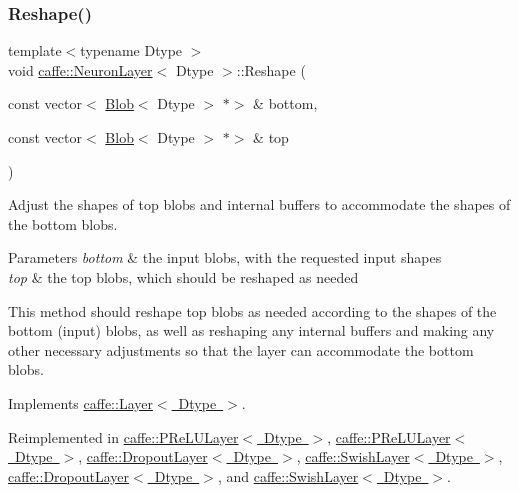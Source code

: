 \mbox{\label{classcaffe_1_1_neuron_layer_a6d0facf4a5e6f459cf1cb8b28d945790}} 
\subsubsection{\texorpdfstring{Reshape()}{Reshape()}\hspace{0.1cm}{\footnotesize\ttfamily [2/2]}}
{\footnotesize\ttfamily template$<$typename Dtype $>$ \\
void \mbox{\hyperlink{classcaffe_1_1_neuron_layer}{caffe\+::\+Neuron\+Layer}}$<$ Dtype $>$\+::Reshape (\begin{DoxyParamCaption}\item[{const vector$<$ \mbox{\hyperlink{classcaffe_1_1_blob}{Blob}}$<$ Dtype $>$ $\ast$$>$ \&}]{bottom,  }\item[{const vector$<$ \mbox{\hyperlink{classcaffe_1_1_blob}{Blob}}$<$ Dtype $>$ $\ast$$>$ \&}]{top }\end{DoxyParamCaption})\hspace{0.3cm}{\ttfamily [virtual]}}



Adjust the shapes of top blobs and internal buffers to accommodate the shapes of the bottom blobs. 


\begin{DoxyParams}{Parameters}
{\em bottom} & the input blobs, with the requested input shapes \\
\hline
{\em top} & the top blobs, which should be reshaped as needed\\
\hline
\end{DoxyParams}
This method should reshape top blobs as needed according to the shapes of the bottom (input) blobs, as well as reshaping any internal buffers and making any other necessary adjustments so that the layer can accommodate the bottom blobs. 

Implements \mbox{\hyperlink{classcaffe_1_1_layer_a7fe981e8af8d93d587acf2a952be563d}{caffe\+::\+Layer$<$ Dtype $>$}}.



Reimplemented in \mbox{\hyperlink{classcaffe_1_1_p_re_l_u_layer_a50ad2070e060093556d1fc12f31e33b1}{caffe\+::\+P\+Re\+L\+U\+Layer$<$ Dtype $>$}}, \mbox{\hyperlink{classcaffe_1_1_p_re_l_u_layer_a923c7c14b470ff84a9b8ee4a93395b5d}{caffe\+::\+P\+Re\+L\+U\+Layer$<$ Dtype $>$}}, \mbox{\hyperlink{classcaffe_1_1_dropout_layer_a8ddbd583b7430f228506954910935505}{caffe\+::\+Dropout\+Layer$<$ Dtype $>$}}, \mbox{\hyperlink{classcaffe_1_1_swish_layer_a995afbac7e3adc0bfe157b0458656a9e}{caffe\+::\+Swish\+Layer$<$ Dtype $>$}}, \mbox{\hyperlink{classcaffe_1_1_dropout_layer_a93f66d83b510987fe37a42d14e6ff98a}{caffe\+::\+Dropout\+Layer$<$ Dtype $>$}}, and \mbox{\hyperlink{classcaffe_1_1_swish_layer_aecf840a1202549b60742eb11a2f188ee}{caffe\+::\+Swish\+Layer$<$ Dtype $>$}}.


